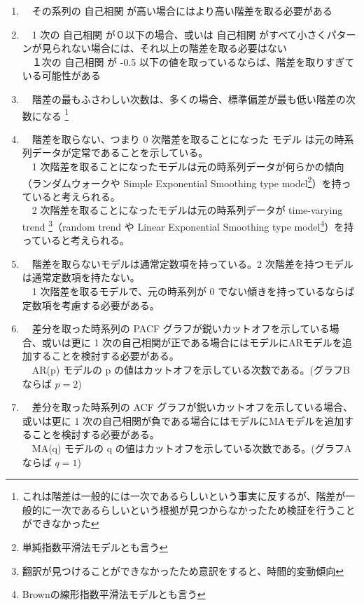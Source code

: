 \documentclass{scrartcl}
\begin{document}
\begin{enumerate}
\item 　その系列の 自己相関 が高い場合にはより高い階差を取る必要がある\\
\item 　1 次の 自己相関 が０以下の場合、或いは 自己相関 がすべて小さくパターンが見られない場合には、それ以上の階差を取る必要はない\\
　１次の 自己相関 が -0.5 以下の値を取っているならば、階差を取りすぎている可能性がある\\
\item 　階差の最もふさわしい次数は、多くの場合、標準偏差が最も低い階差の次数になる \footnote{これは階差は一般的には一次であるらしいという事実に反するが、階差が一般的に一次であるらしいという根拠が見つからなかったため検証を行うことができなかった}\\
\item 　階差を取らない、つまり 0 次階差を取ることになった モデル は元の時系列データが定常であることを示している。\\
　1 次階差を取ることになったモデルは元の時系列データが何らかの傾向（ランダムウォークや Simple Exponential Smoothing type model\footnote{単純指数平滑法モデルとも言う}）を持っていると考えられる。\\
　2 次階差を取ることになったモデルは元の時系列データが time-varying trend \footnote{翻訳が見つけることができなかったため意訳をすると、時間的変動傾向}（random trend や Linear Exponential Smoothing type model\footnote{Brownの線形指数平滑法モデルとも言う}）を持っていると考えられる。\\
\item 　階差を取らないモデルは通常定数項を持っている。2 次階差を持つモデルは通常定数項を持たない。\\
　1 次階差を取るモデルで、元の時系列が 0 でない傾きを持っているならば 定数項を考慮する必要がある。\\
\item 　差分を取った時系列の PACF グラフが鋭いカットオフを示している場合、或いは更に 1 次の自己相関が正である場合にはモデルにARモデルを追加することを検討する必要がある。\\
　AR(p) モデルの p の値はカットオフを示している次数である。(グラフBならば \(p = 2\))\\
\item 　差分を取った時系列の ACF グラフが鋭いカットオフを示している場合、或いは更に 1 次の自己相関が負である場合にはモデルにMAモデルを追加することを検討する必要がある。\\
　MA(q) モデルの q の値はカットオフを示している次数である。(グラフAならば \(q=1\))\\

\end{enumerate}
\end{document}
